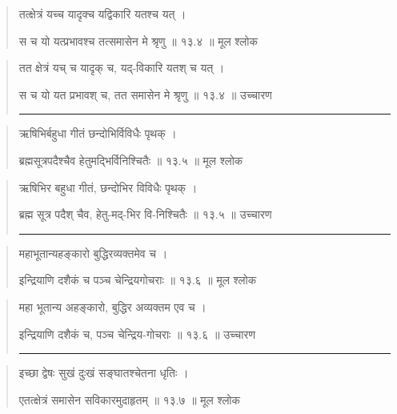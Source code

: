 \begin{quotation}

तत्क्षेत्रं यच्च यादृक्च यद्विकारि यतश्च यत्‌ ।  

स च यो यत्प्रभावश्च तत्समासेन मे श्रृणु  ॥ १३.४ ॥  मूल श्लोक
\end{quotation}

\begin{quotation}

तत क्षेत्रं यच् च यादृक् च, यद्-विकारि यतश् च यत्‌ ।  

स च यो यत प्रभावश् च, तत समासेन मे श्रृणु  ॥ १३.४ ॥  उच्चारण

\noindent\rule{16cm}{0.4pt} 
\end{quotation}


\begin{quotation}

ऋषिभिर्बहुधा गीतं छन्दोभिर्विविधैः पृथक्‌  ।  

ब्रह्मसूत्रपदैश्चैव हेतुमद्भिर्विनिश्चितैः  ॥ १३.५ ॥  मूल श्लोक
\end{quotation}

\begin{quotation}
ऋषिभिर बहुधा गीतं, छन्दोभिर विविधैः पृथक्‌  ।  

ब्रह्म सूत्र पदैश् चैव, हेतु-मद्-भिर वि-निश्चितैः  ॥ १३.५ ॥  उच्चारण

\noindent\rule{16cm}{0.4pt} 
\end{quotation}


\begin{quotation}

महाभूतान्यहङ्‍कारो बुद्धिरव्यक्तमेव च  ।  

इन्द्रियाणि दशैकं च पञ्च चेन्द्रियगोचराः  ॥ १३.६ ॥  मूल श्लोक
\end{quotation}

\begin{quotation}

महा भूतान्य अहङ्‍कारो, बुद्धिर अव्यक्तम एव च  ।  

इन्द्रियाणि दशैकं च, पञ्च चेन्द्रिय-गोचराः  ॥ १३.६ ॥  उच्चारण

\noindent\rule{16cm}{0.4pt} 
\end{quotation}


\begin{quotation}

इच्छा द्वेषः सुखं दुःखं सङ्‍घातश्चेतना धृतिः  ।  

एतत्क्षेत्रं समासेन सविकारमुदाहृतम्‌  ॥ १३.७ ॥  मूल श्लोक
\end{quotation}

